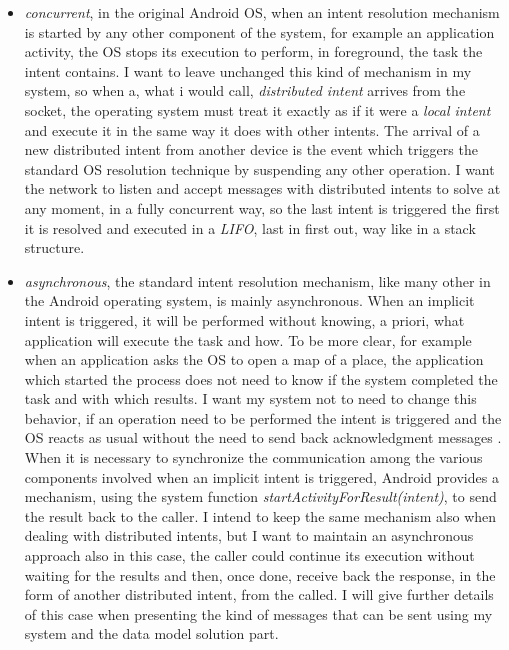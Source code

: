 \begin{itemize}
	\item \textit{concurrent}, in the original Android OS, when an intent resolution mechanism is started by any other component of the system, for example an application activity, the OS stops its execution to perform, in foreground, the task the intent contains. I want to leave unchanged this kind of mechanism in my system, so when a, what i would call, \textit{distributed intent} arrives from the socket, the operating system must treat it exactly as if it were a \textit{local intent} and execute it in the same way it does with other intents. The arrival of a new distributed intent from another device is the event which triggers the standard OS resolution technique by suspending any other operation. I want the network to listen and accept messages with distributed intents to solve at any moment, in a fully concurrent way, so the last intent is triggered the first it is resolved and executed in a \textit{LIFO}, last in first out, way like in a stack structure.
	\item \textit{asynchronous}, the standard intent resolution mechanism, like many other in the Android operating system, is mainly asynchronous. When an implicit intent is triggered, it will be performed without knowing, a priori, what application will execute the task and how. To be more clear, for example when an application asks the OS to open a map of a place, the application which started the process does not need to know if the system completed the task and with which results. I want my system not to need to change this behavior, if an operation need to be performed the intent is triggered and the OS reacts as usual without the need to send back acknowledgment messages . When it is necessary to synchronize the communication among the various components involved when an implicit intent is triggered, Android provides a mechanism, using the system function \textit{startActivityForResult(intent)}, to send the result back to the caller. I intend to keep the same mechanism also when dealing with distributed intents, but I want to maintain an asynchronous approach also in this case, the caller could continue its execution without waiting for the results and then, once done, receive back the response, in the form of another distributed intent, from the called. I will give further details of this case when presenting the kind of messages that can be sent using my system and the data model solution part.
 \end{itemize}


